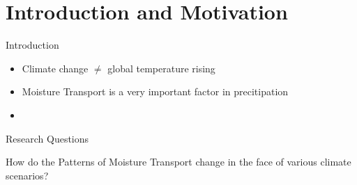 \section[Intro]{Introduction and Motivation}
\begin{frame}{Introduction}

\begin{itemize}
  \item Climate change $\neq$ global temperature rising 
  \item Moisture Transport is a very important factor in precitipation 
  \item 
  
\end{itemize}

\end{frame}

\begin{frame}{Research Questions}
  
\bullet How do the Patterns of Moisture Transport change in the face of various climate scenarios?

\end{frame}
